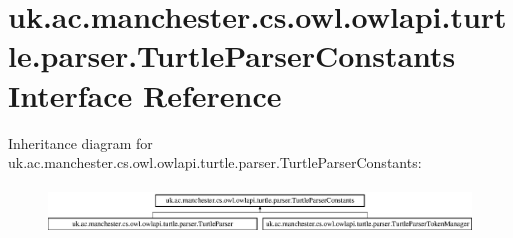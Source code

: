 \hypertarget{interfaceuk_1_1ac_1_1manchester_1_1cs_1_1owl_1_1owlapi_1_1turtle_1_1parser_1_1_turtle_parser_constants}{\section{uk.\-ac.\-manchester.\-cs.\-owl.\-owlapi.\-turtle.\-parser.\-Turtle\-Parser\-Constants Interface Reference}
\label{interfaceuk_1_1ac_1_1manchester_1_1cs_1_1owl_1_1owlapi_1_1turtle_1_1parser_1_1_turtle_parser_constants}
}
Inheritance diagram for uk.\-ac.\-manchester.\-cs.\-owl.\-owlapi.\-turtle.\-parser.\-Turtle\-Parser\-Constants\-:\begin{figure}[H]
\begin{center}
\leavevmode
\includegraphics[height=1.296296cm]{interfaceuk_1_1ac_1_1manchester_1_1cs_1_1owl_1_1owlapi_1_1turtle_1_1parser_1_1_turtle_parser_constants}
\end{center}
\end{figure}
